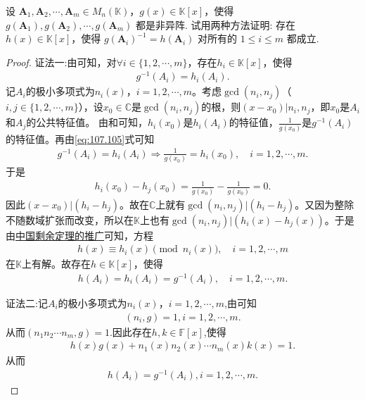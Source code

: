 \documentclass[../../main.tex]{subfiles}%
\begin{document}
\begin{example}
设 \( \boldsymbol{A}_1, \boldsymbol{A}_2, \cdots, \boldsymbol{A}_m \in M_n(\mathbb{K}) \)，\( g(x) \in \mathbb{K}[x] \)，使得 \( g(\boldsymbol{A}_1), g(\boldsymbol{A}_2), \cdots, g(\boldsymbol{A}_m) \) 都是非异阵. 试用两种方法证明: 存在 \( h(x) \in \mathbb{K}[x] \)，使得 \( g(\boldsymbol{A}_i)^{-1} = h(\boldsymbol{A}_i) \) 对所有的 \( 1 \leqslant i \leqslant m \) 都成立.
\end{example}
\begin{proof}

{\color{blue}证法一:}由可知，对\(\forall i\in \{1,2,\cdots ,m\}\)，存在\(h_i\in \mathbb{K}[x]\)，使得
\begin{align}
g^{-1}(A_i) = h_i(A_i). \label{eq:107.105}
\end{align}
记\(A_i\)的极小多项式为\(n_i(x)\)，\(i=1,2,\cdots,m\)。考虑\(\gcd(n_i,n_j)\)（\(i,j\in \{1,2,\cdots ,m\}\)），设\(x_0\in \mathbb{C}\)是\(\gcd(n_i,n_j)\)的根，则\((x-x_0)|n_i,n_j\)，即\(x_0\)是\(A_i\)和\(A_j\)的公共特征值。
由和可知，\(h_i(x_0)\)是\(h_i(A_i)\)的特征值，\(\frac{1}{g(x_0)}\)是\(g^{-1}(A_i)\)的特征值。再由\eqref{eq:107.105}式可知
\begin{align*}
g^{-1}(A_i) = h_i(A_i) \Longrightarrow \frac{1}{g(x_0)} = h_i(x_0),\quad i=1,2,\cdots,m.
\end{align*}
于是
\begin{align*}
h_i(x_0) - h_j(x_0) = \frac{1}{g(x_0)} - \frac{1}{g(x_0)} = 0.
\end{align*}
因此\((x-x_0)|(h_i - h_j)\)。故在\(\mathbb{C}\)上就有\(\gcd(n_i,n_j)|(h_i - h_j)\)。又因为整除不随数域扩张而改变，所以在\(\mathbb{K}\)上也有\(\gcd(n_i,n_j)|(h_i(x) - h_j(x))\)。于是由\hyperref[theorem:中国剩余定理推广(模不互质的情况)]{中国剩余定理的推广}可知，方程
\begin{align*}
h(x) \equiv h_i(x) \pmod{n_i(x)},\quad i=1,2,\cdots,m
\end{align*}
在\(\mathbb{K}\)上有解。故存在\(h\in \mathbb{K}[x]\)，使得
\begin{align*}
h(A_i) = h_i(A_i) = g^{-1}(A_i),\quad i=1,2,\cdots,m.
\end{align*}

{\color{blue}证法二:}记\(A_i\)的极小多项式为\(n_i(x)\)，\(i=1,2,\cdots,m\),由可知
\begin{align*}
(n_i,g)=1,i=1,2,\cdots,m.
\end{align*}
从而$\left( n_1n_2\cdots n_m,g \right) =1$.因此存在$h,k\in \mathbb{F}[x]$,使得
\begin{align*}
h\left( x \right) g\left( x \right) +n_1\left( x \right) n_2\left( x \right) \cdots n_m\left( x \right) k\left( x \right) =1.
\end{align*}
从而
\begin{align*}
h\left( A_i \right) =g^{-1}\left( A_i \right) ,i=1,2,\cdots ,m.
\end{align*}
\end{proof}
\end{document}
